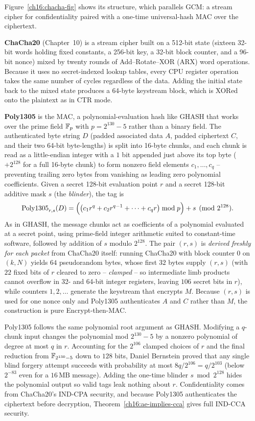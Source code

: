 Figure~\ref{ch16:chacha-fig} shows its structure, which parallels GCM: a stream cipher for confidentiality paired with a one-time universal-hash MAC over the ciphertext.

\textbf{ChaCha20} (Chapter~10) is a stream cipher built on a 512-bit state (sixteen 32-bit words holding fixed constants, a 256-bit key, a 32-bit block counter, and a 96-bit nonce) mixed by twenty rounds of Add--Rotate--XOR (ARX) word operations. Because it uses no secret-indexed lookup tables, every CPU register operation takes the same number of cycles regardless of the data. Adding the initial state back to the mixed state produces a 64-byte keystream block, which is XORed onto the plaintext as in CTR mode.

\textbf{Poly1305} is the MAC, a polynomial-evaluation hash like GHASH that works over the prime field $\mathbb{F}_p$ with $p = 2^{130} - 5$ rather than a binary field. The authenticated byte string $D$ (padded associated data $A$, padded ciphertext $C$, and their two 64-bit byte-lengths) is split into 16-byte chunks, and each chunk is read as a little-endian integer with a $1$ bit appended just above its top byte ($+2^{128}$ for a full 16-byte chunk) to form nonzero field elements $c_1, \dots, c_q$ -- preventing trailing zero bytes from vanishing as leading zero polynomial coefficients. Given a secret 128-bit evaluation point $r$ and a secret 128-bit additive mask $s$ (the \emph{blinder}), the tag is
\[
\operatorname{Poly1305}_{r,s}(D) = \Bigl( \bigl( c_1 r^{q} + c_2 r^{q-1} + \cdots + c_q r \bigr) \bmod p \Bigr) + s \pmod{2^{128}}.
\]
As in GHASH, the message chunks act as coefficients of a polynomial evaluated at a secret point, using prime-field integer arithmetic suited to constant-time software, followed by addition of $s$ modulo $2^{128}$. The pair $(r, s)$ is \emph{derived freshly for each packet} from ChaCha20 itself: running ChaCha20 with block counter $0$ on $(k, N)$ yields $64$ pseudorandom bytes, whose first $32$ bytes supply $(r, s)$ (with $22$ fixed bits of $r$ cleared to zero -- \emph{clamped} -- so intermediate limb products cannot overflow in 32- and 64-bit integer registers, leaving $106$ secret bits in $r$), while counters $1, 2, \dots$ generate the keystream that encrypts $M$. Because $(r, s)$ is used for one nonce only and Poly1305 authenticates $A$ and $C$ rather than $M$, the construction is pure Encrypt-then-MAC.

\begin{whybox}
Poly1305 follows the same polynomial root argument as GHASH. Modifying a $q$-chunk input changes the polynomial mod $2^{130}-5$ by a nonzero polynomial of degree at most $q$ in $r$. Accounting for the $2^{106}$ clamped choices of $r$ and the final reduction from $\mathbb{F}_{2^{130}-5}$ down to $128$ bits, Daniel Bernstein proved that any single blind forgery attempt succeeds with probability at most $8q / 2^{106} = q / 2^{103}$ (below $2^{-83}$ even for a $16\,\text{MB}$ message). Adding the one-time blinder $s \bmod 2^{128}$ hides the polynomial output so valid tags leak nothing about $r$. Confidentiality comes from ChaCha20's IND-CPA security, and because Poly1305 authenticates the ciphertext before decryption, Theorem~\ref{ch16:ae-implies-cca} gives full IND-CCA security.
\end{whybox}

